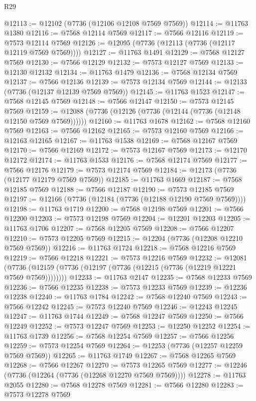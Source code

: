 \begin{lexlean}{R29}
\begin{coremodule}
@12113 := @12102 (@7736 (@12106 @12108 @7569 @7569))
@12114 := @11763 @1380
@12116 := @7568 @12114 @7569
@12117 := @7566 @12116
@12119 := @7573 @12114 @7569
@12126 := @12095 (@7736 (@12113 (@7736 (@12117 @12119 @7569 @7569))))
@12127 := @11763 @1491
@12129 := @7568 @12127 @7569
@12130 := @7566 @12129
@12132 := @7573 @12127 @7569
@12133 := @12130 @12132
@12134 := @11763 @1479
@12136 := @7568 @12134 @7569
@12137 := @7566 @12136
@12139 := @7573 @12134 @7569
@12144 := @12133 (@7736 (@12137 @12139 @7569 @7569))
@12145 := @11763 @1523
@12147 := @7568 @12145 @7569
@12148 := @7566 @12147
@12150 := @7573 @12145 @7569
@12159 := @12088 (@7736 (@12126 (@7736 (@12144 (@7736 (@12148 @12150 @7569 @7569))))))
@12160 := @11763 @1678
@12162 := @7568 @12160 @7569
@12163 := @7566 @12162
@12165 := @7573 @12160 @7569
@12166 := @12163 @12165
@12167 := @11763 @1538
@12169 := @7568 @12167 @7569
@12170 := @7566 @12169
@12172 := @7573 @12167 @7569
@12173 := @12170 @12172
@12174 := @11763 @1533
@12176 := @7568 @12174 @7569
@12177 := @7566 @12176
@12179 := @7573 @12174 @7569
@12184 := @12173 (@7736 (@12177 @12179 @7569 @7569))
@12185 := @11763 @1669
@12187 := @7568 @12185 @7569
@12188 := @7566 @12187
@12190 := @7573 @12185 @7569
@12197 := @12166 (@7736 (@12184 (@7736 (@12188 @12190 @7569 @7569))))
@12198 := @11763 @1719
@12200 := @7568 @12198 @7569
@12201 := @7566 @12200
@12203 := @7573 @12198 @7569
@12204 := @12201 @12203
@12205 := @11763 @1706
@12207 := @7568 @12205 @7569
@12208 := @7566 @12207
@12210 := @7573 @12205 @7569
@12215 := @12204 (@7736 (@12208 @12210 @7569 @7569))
@12216 := @11763 @1724
@12218 := @7568 @12216 @7569
@12219 := @7566 @12218
@12221 := @7573 @12216 @7569
@12232 := @12081
    (@7736 (@12159 (@7736 (@12197 (@7736 (@12215 (@7736 (@12219 @12221 @7569 @7569))))))))
@12233 := @11763 @2147
@12235 := @7568 @12233 @7569
@12236 := @7566 @12235
@12238 := @7573 @12233 @7569
@12239 := @12236 @12238
@12240 := @11763 @1784
@12242 := @7568 @12240 @7569
@12243 := @7566 @12242
@12245 := @7573 @12240 @7569
@12246 := @12243 @12245
@12247 := @11763 @1744
@12249 := @7568 @12247 @7569
@12250 := @7566 @12249
@12252 := @7573 @12247 @7569
@12253 := @12250 @12252
@12254 := @11763 @1739
@12256 := @7568 @12254 @7569
@12257 := @7566 @12256
@12259 := @7573 @12254 @7569
@12264 := @12253 (@7736 (@12257 @12259 @7569 @7569))
@12265 := @11763 @1749
@12267 := @7568 @12265 @7569
@12268 := @7566 @12267
@12270 := @7573 @12265 @7569
@12277 := @12246 (@7736 (@12264 (@7736 (@12268 @12270 @7569 @7569))))
@12278 := @11763 @2055
@12280 := @7568 @12278 @7569
@12281 := @7566 @12280
@12283 := @7573 @12278 @7569

\end{coremodule}
\end{lexlean}
